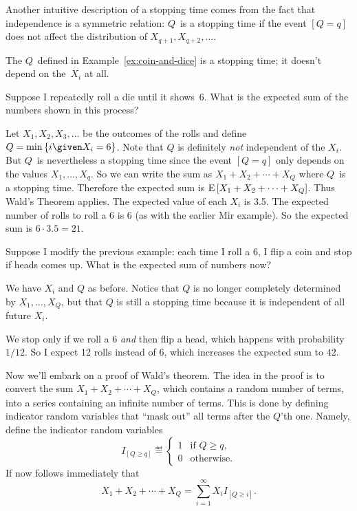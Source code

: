 \documentclass[11pt,twoside]{article}
\begin{document}
Another intuitive description of a stopping time comes from the fact
that independence is a symmetric relation: $Q$~is a stopping time if
the event $[Q = q]$ does not affect the distribution of $X_{q+1},
X_{q+2}, \dots$.
\begin{example}
  The $Q$~defined in Example~\ref{ex:coin-and-dice} is a stopping
  time; it doesn't depend on the~$X_i$ at all.
\end{example}
\begin{example}
  \label{ex:wald-dice}
  Suppose I repeatedly roll a die until it shows~6. What is the
  expected sum of the numbers shown in this process?

  Let $X_1, X_2, X_3, \dots$ be the outcomes of the rolls and define
  $Q = \min\set{i \given X_i = 6}$.  Note that $Q$ is definitely
  \emph{not} independent of the $X_i$.  But $Q$~is nevertheless a
  stopping time since the event $[Q = q]$ only depends on the values
  $X_1, \ldots, X_q$.  So we can write the sum as $X_1 + X_2 + \cdots
  + X_Q$ where $Q$~is a stopping time.  Therefore the expected sum is
  $\mathop{\textup{E}}\nolimits\left[X_1 + X_2 + \cdots + X_Q\right]$.  Thus Wald's Theorem applies.
  The expected value of each $X_i$ is 3.5.  The expected number of
  rolls to roll a 6 is 6 (as with the earlier Mir example).  So the
  expected sum is $6\cdot 3.5=21$.
\end{example}

\begin{example}
  Suppose I modify the previous example: each time I roll a 6, I flip
  a coin and stop if heads comes up.  What is the expected sum of
  numbers now?
  
  We have $X_i$ and $Q$ as before.  Notice that $Q$ is no longer
  completely determined by $X_1,\ldots,X_Q$, but that $Q$ is still a
  stopping time because it is independent of all future $X_i$.
  
  We stop only if we roll a 6 \emph{and} then flip a head, which
  happens with probability $1/12$.  So I expect 12 rolls instead of 6,
  which increases the expected sum to $42$.
\end{example}

Now we'll embark on a proof of Wald's theorem.  The idea in the proof is
to convert the sum $X_1 + X_2 + \cdots + X_Q$, which contains a random
number of terms, into a series containing an infinite number of terms.
This is done by defining indicator random variables that ``mask out'' all
terms after the $Q$'th one.  Namely, define the indicator random variables
\[
I_{[Q \geq q]} \eqdef \begin{cases}
  1 & \mbox{if $Q \geq q$,} \\
  0 & \mbox{otherwise.}
\end{cases}
\]
If now follows immediately that
\begin{equation}\label{lem:wald-indicators}
    X_1 + X_2 + \cdots + X_Q = \sum_{i=1}^{\infty} X_i I_{[Q \geq i]}.
\end{equation}
\end{document}
